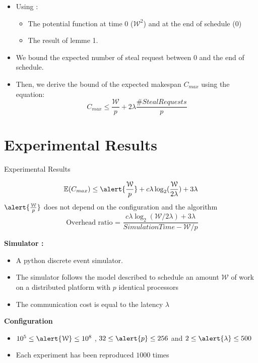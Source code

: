 \documentclass{beamer}
\begin{document}
    \begin{frame}
        \begin{itemize}
            \item Using :
        \begin{itemize}
            \item The potential function at time 0 \alert{($\mathcal{W}^2$)} and at the end of schedule \alert{(0)}
            \item The result of lemme 1.
        \end{itemize}
    \item We bound the expected number of steal request between $0$ and the end of schedule.
                
    \item Then, we derive the bound of the expected makespan $C_{max}$ using the equation:
        \begin{equation*}
            C_{max}  \leq \frac{\mathcal{W}}{p} + 2\lambda\frac{\#StealRequests}{p}
        \end{equation*} 
        \end{itemize}
\end{frame}

\section{Experimental Results}
\begin{frame}{Experimental Results}

        \begin{equation*}   
            \mathbb{E}(C_{max}) \leq \alert{\frac{\mathcal{W}}{p}} +  c\lambda\log_2(\frac{\mathcal{W}}{2\lambda}) + 3\lambda
        \end{equation*}             
       $ \alert{\frac{\mathcal{W}}{p}} $ \alert{does not depend on the configuration and the algorithm }
\pause
    \begin{equation*}
        \text{ Overhead ratio = } \frac{c\lambda\log_2(\mathcal{W}/2\lambda) + 3\lambda}{Simulation Time - \mathcal{W}/p} 
    \end{equation*}
\pause

    \textbf{Simulator : }
    \begin{itemize}
        \item A python discrete event simulator.
        \item The simulator follows the model described to schedule an amount $\mathcal{W}$ of work on a distributed platform with $p$ identical processors 
        \item The communication cost is equal to the latency $\lambda$
    \end{itemize}
    \textbf{Configuration}
    \begin{itemize}
        \item  $ 10^5 \leq \alert{\mathcal{W}} \leq 10^8$
            , $ 32 \leq \alert{p} \leq 256$ and  
            $ 2 \leq \alert{\lambda} \leq 500$ 
        \item Each experiment has been reproduced \alert{$1000$} times
    \end{itemize}
\end{frame}
\end{document}
